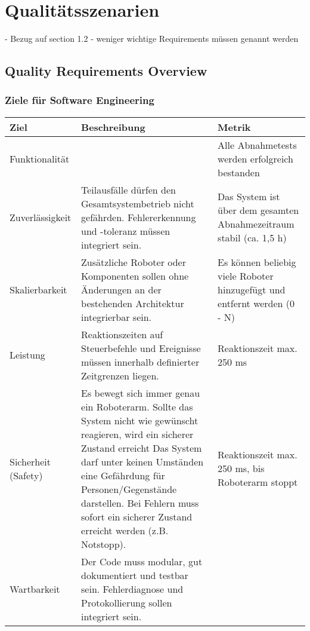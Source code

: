 \chapter{Qualitätsszenarien}
- Bezug auf section 1.2 
- weniger wichtige Requirements müssen genannt werden

\section{Quality Requirements Overview}



\subsection{Ziele für Software Engineering}
\begin{table}[h!]
	\centering
	\begin{tabular}{p{4cm}|p{5cm}|p{5cm}|}
		\hline
		\textbf{Ziel} & \textbf{Beschreibung} & \textbf{Metrik} \\
		\hline
		Funktionalität &  
		& Alle Abnahmetests werden erfolgreich bestanden
		\\
		\hline
		Zuverlässigkeit & 
		Teilausfälle dürfen den Gesamtsystembetrieb nicht gefährden. Fehlererkennung und -toleranz müssen integriert sein.
		& Das System ist über dem gesamten Abnahmezeitraum stabil (ca. 1,5 h)
		\\
		\hline
		Skalierbarkeit & 
		Zusätzliche Roboter oder Komponenten sollen ohne Änderungen an der bestehenden Architektur integrierbar sein. 
		& Es können beliebig viele Roboter hinzugefügt und entfernt werden (0 - N)
		\\
		\hline
		Leistung & 
		Reaktionszeiten auf Steuerbefehle und Ereignisse müssen innerhalb definierter Zeitgrenzen liegen. 
		& Reaktionszeit max. 250 ms
		\\
		\hline
		Sicherheit (Safety) & 
		Es bewegt sich immer genau ein Roboterarm. Sollte das System nicht wie gewünscht reagieren, wird ein sicherer Zustand erreicht
		Das System darf unter keinen Umständen eine Gefährdung für Personen/Gegenstände darstellen. Bei Fehlern muss sofort ein sicherer Zustand erreicht werden (z.B. Notstopp). 
		& Reaktionszeit max. 250 ms, bis Roboterarm stoppt
		\\
		\hline
		Wartbarkeit & 
		Der Code muss modular, gut dokumentiert und testbar sein. Fehlerdiagnose und Protokollierung sollen integriert sein. 

\end{tabular}
\end{table}
